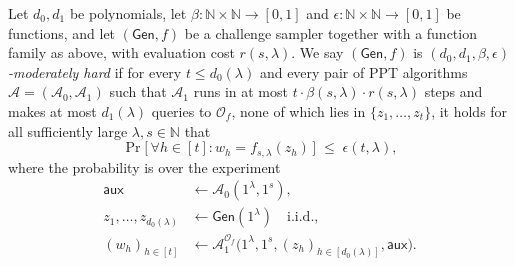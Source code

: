 \documentclass{aicr-conjecture}
\newcommand{\NN}{\mathbb{N}}
\newcommand{\Gen}{\mathsf{Gen}}
\newcommand{\aux}{\mathsf{aux}}
\newcommand{\Adv}{\mathcal{A}}
\newcommand{\Orc}{\mathcal{O}}
\begin{document}
\begin{definition}\label{def:mh}
Let $d_0, d_1$ be polynomials, let $\beta : \NN \times \NN \to [0,1]$ and $\epsilon : \NN \times \NN \to [0,1]$ be functions, and let $(\Gen, f)$ be a challenge sampler together with a function family as above, with evaluation cost $r(s,\lambda)$. We say $(\Gen, f)$ is \emph{$(d_0,d_1,\beta,\epsilon)$-moderately hard} if for every $t \le d_0(\lambda)$ and every pair of PPT algorithms $\Adv = (\Adv_0, \Adv_1)$ such that $\Adv_1$ runs in at most $t \cdot \beta(s,\lambda) \cdot r(s,\lambda)$ steps and makes at most $d_1(\lambda)$ queries to $\Orc_f$, none of which lies in $\{z_1,\dots,z_t\}$, it holds for all sufficiently large $\lambda, s \in \NN$ that
\[
\Pr\bigl[\, \forall h \in [t] : w_h = f_{s,\lambda}(z_h) \,\bigr] \;\le\; \epsilon(t,\lambda),
\]
where the probability is over the experiment
\begin{align*}
\aux &\leftarrow \Adv_0(1^{\lambda},1^{s}), \\
z_1,\dots,z_{d_0(\lambda)} &\leftarrow \Gen(1^{\lambda}) \quad \text{i.i.d.}, \\
(w_h)_{h \in [t]} &\leftarrow \Adv_1^{\Orc_f}\bigl(1^{\lambda},1^{s},(z_h)_{h \in [d_0(\lambda)]},\aux\bigr).
\end{align*}
\end{definition}
\end{document}
